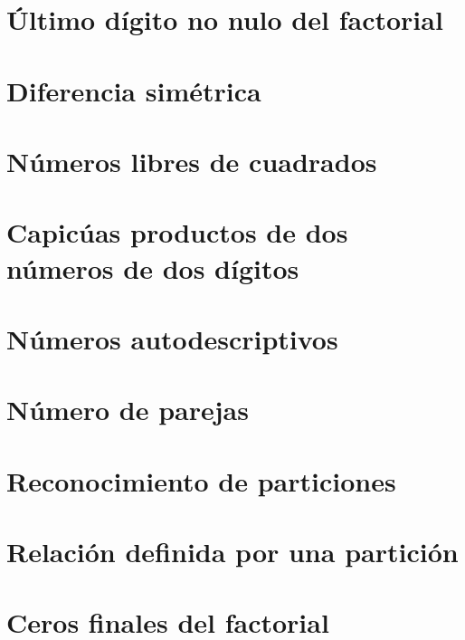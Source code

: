 \documentclass[a4paper,12pt,twoside]{book}
\begin{document}
\chapter{Último dígito no nulo del factorial}

\chapter{Diferencia simétrica}

\chapter{Números libres de cuadrados}

\chapter{Capicúas productos de dos números de dos dígitos}

 
\chapter{Números autodescriptivos}

\chapter{Número de parejas}

\chapter{Reconocimiento de particiones}

\chapter{Relación definida por una partición}

\chapter{Ceros finales del factorial}
\end{document}
